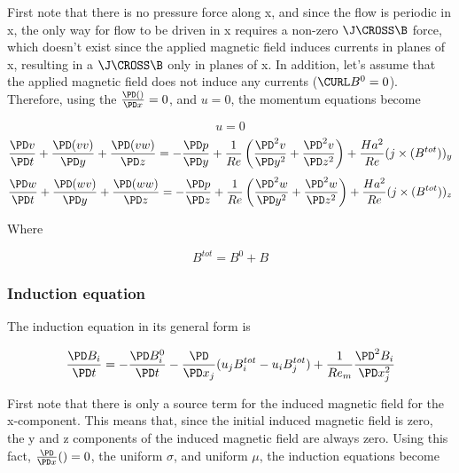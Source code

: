 \documentclass[11pt]{article}
\begin{document}
First note that there is no pressure force along x, and since the flow is periodic in x, the only way for flow to be driven in x requires a non-zero $\J \CROSS \B$ force, which doesn't exist since the applied magnetic field induces currents in planes of x, resulting in a $\J \CROSS \B$ only in planes of x. In addition, let's assume that the applied magnetic field does not induce any currents ($\CURL B^0=0$). Therefore, using the $\frac{\PD ()}{\PD x} = 0$, and $u = 0$, the momentum equations become

\begin{equation}
	u=0
\end{equation}
\begin{equation}
	\frac{\PD v}{\PD t}
	+ \frac{\PD (v v)}{\PD y}
	+ \frac{\PD (v w)}{\PD z}
	=
	- \frac{\PD p}{\PD y}
	+ \frac{1}{Re}
	\left(
	\frac{\PD^2 v}{\PD y^2}
	+\frac{\PD^2 v}{\PD z^2}
	\right)
	+ \frac{Ha^2}{Re}
	(j \times (B^{tot}))_y
\end{equation}
\begin{equation}
	\frac{\PD w}{\PD t}
	+ \frac{\PD (w v)}{\PD y}
	+ \frac{\PD (w w)}{\PD z}
	=
	- \frac{\PD p}{\PD z}
	+ \frac{1}{Re}
	\left(
	\frac{\PD^2 w}{\PD y^2}
	+\frac{\PD^2 w}{\PD z^2}
	\right)
	+ \frac{Ha^2}{Re}
	(j \times (B^{tot}))_z
\end{equation}

Where

\begin{equation}
	B^{tot} = B^0 + B
\end{equation}

\subsubsection{Induction equation}

The induction equation in its general form is

\begin{equation}
	\frac{\PD B_i}{\PD t}
	=
	- \frac{\PD B_i^0}{\PD t}
	- \frac{\PD}{\PD x_j} (u_j B_i^{tot} - u_i B_j^{tot})
	+
	\frac{1}{Re_m}
	\frac{\PD^2 B_i}{\PD x_j^2}
\end{equation}

First note that there is only a source term for the induced magnetic field for the x-component. This means that, since the initial induced magnetic field is zero, the y and z components of the induced magnetic field are always zero. Using this fact, $\frac{\PD}{\PD x} ()=0$, the uniform $\sigma$, and uniform $\mu$, the induction equations become
\end{document}
